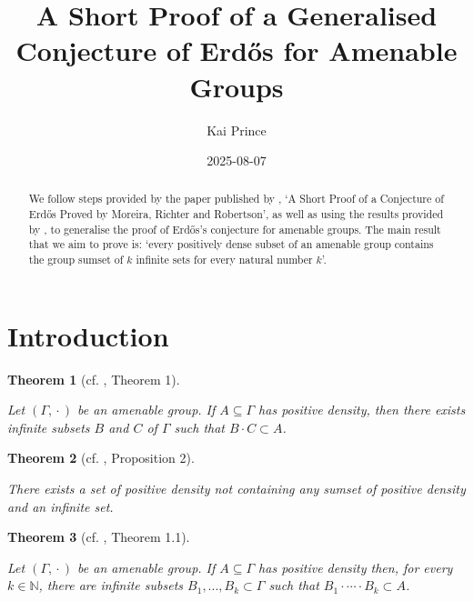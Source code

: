 \documentclass[
  british,
]{article}
\title{A Short Proof of a Generalised Conjecture of Erdős for Amenable
Groups}
\author{Kai Prince}
\date{2025-08-07}
\renewcommand*\contentsname{Table of contents}
\newcommand\contentsname{Table of contents}
\theoremstyle{definition}
\theoremstyle{plain}
\newtheorem{theorem}{Theorem}[section]
\theoremstyle{plain}
\theoremstyle{remark}
\newcommand{\N}{\mathbb{N}}
\newcommand{\GroupOperation}[2]{{#1}\cdot{#2}}
\newcommand{\AmenableGroup}{{\Gamma}}
\begin{document}
\maketitle
\begin{abstract}
We follow steps provided by the paper published by
, `A Short Proof of a
Conjecture of Erdős Proved by Moreira, Richter and Robertson', as well
as using the results provided by , to generalise the proof of Erdős's conjecture for amenable
groups. The main result that we aim to prove is: `every positively dense
subset of an amenable group contains the group sumset of \(k\) infinite
sets for every natural number \(k\)'.
\end{abstract}

\renewcommand*\contentsname{Table of contents}
{
\hypersetup{linkcolor=}
\setcounter{tocdepth}{3}
\tableofcontents
}

\section{Introduction}\label{introduction}

\begin{theorem}[cf. , Theorem
1]\protect\hypertarget{thm-GenErdosConjComb}{}\label{thm-GenErdosConjComb}

Let \((\AmenableGroup,\GroupOperation{}{})\) be an amenable group. If
\(A\subseteq\AmenableGroup\) has positive density, then there exists
infinite subsets \(B\) and \(C\) of \(\AmenableGroup\) such that
\(\GroupOperation{B}{C}\subset A\).

\end{theorem}

\begin{theorem}[cf. ,
Proposition
2]\protect\hypertarget{thm-GenErdosConjRel}{}\label{thm-GenErdosConjRel}

There exists a set of positive density not containing any sumset of
positive density and an infinite set.

\end{theorem}

\begin{theorem}[cf. ,
Theorem
1.1]\protect\hypertarget{thm-GenNErdosConjComb}{}\label{thm-GenNErdosConjComb}

Let \((\AmenableGroup,\GroupOperation{}{})\) be an amenable group. If
\(A\subseteq\AmenableGroup\) has positive density then, for every
\(k\in\N\), there are infinite subsets
\(B_1,...,B_k\subset\AmenableGroup\) such that
\(B_1\cdot\cdots\cdot B_k\subset A\).

\end{theorem}
\end{document}
